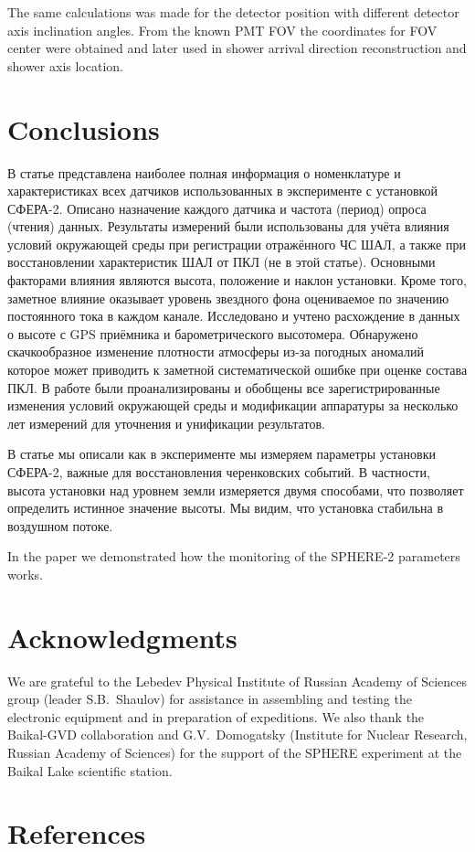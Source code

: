 \documentclass[final,5p,times,twocolumn]{elsarticle}
\begin{document}
The same calculations was made for the detector position with different detector axis inclination angles. From the known PMT FOV the coordinates for FOV center were obtained and later used in shower arrival direction reconstruction and shower axis location.

\section{Conclusions \label{sect:conclusions}}
{\Russian
В статье представлена наиболее полная информация о номенклатуре и характеристиках всех датчиков  использованных в эксперименте с установкой СФЕРА-2. Описано назначение каждого датчика и частота (период) опроса (чтения) данных. Результаты измерений были использованы для учёта влияния условий окружающей среды при регистрации отражённого ЧС ШАЛ, а также при восстановлении характеристик ШАЛ от ПКЛ (не в этой статье).
Основными факторами влияния являются высота, положение и наклон установки. Кроме того, заметное влияние оказывает уровень звездного фона оцениваемое по значению постоянного тока в каждом канале. Исследовано и учтено расхождение в данных о высоте с GPS приёмника и барометрического высотомера. Обнаружено скачкообразное изменение плотности атмосферы из-за погодных аномалий которое может приводить к заметной систематической ошибке при оценке состава ПКЛ. В работе были проанализированы и обобщены все зарегистрированные изменения условий окружающей среды и модификации аппаратуры за несколько лет измерений для уточнения и унификации результатов.

В статье мы описали как в эксперименте мы измеряем параметры установки  СФЕРА-2, важные для восстановления черенковских событий.  В частности, высота установки над уровнем земли измеряется двумя способами, что позволяет определить истинное значение высоты. Мы видим, что установка стабильна в воздушном потоке.
}

In the paper we demonstrated how the monitoring of the SPHERE-2 parameters works. 


\section{Acknowledgments}
We are grateful to the Lebedev Physical Institute of Russian Academy of Sciences group (leader S.B.~Shaulov) for assistance in assembling and testing the electronic equipment and in preparation of expeditions. We also thank the Baikal-GVD collaboration and G.V.~Domogatsky (Institute for Nuclear Research, Russian Academy of Sciences) for the support of the SPHERE experiment at the Baikal Lake scientific station.


\section{References}

\end{document}
